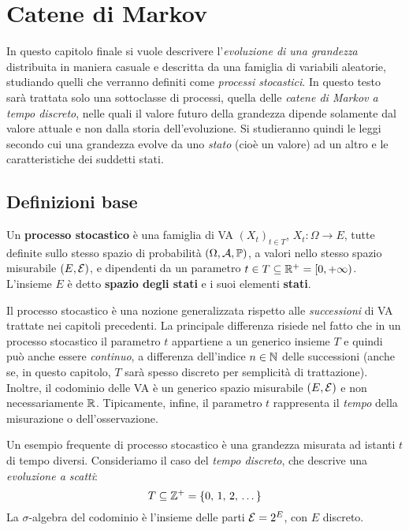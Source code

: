 \section{Catene di Markov}
In questo capitolo finale si vuole descrivere l'\emph{evoluzione di una grandezza} distribuita in maniera casuale e descritta da una famiglia di variabili aleatorie,
studiando quelli che verranno definiti come \emph{processi stocastici}.
In questo testo sarà trattata solo una sottoclasse di processi,
quella delle \emph{catene di Markov a tempo discreto}, nelle quali il valore futuro della grandezza dipende solamente dal valore attuale e non dalla storia dell'evoluzione.
Si studieranno quindi le leggi secondo cui una grandezza evolve da uno \textit{stato} (cioè un valore) ad un altro e le caratteristiche dei suddetti stati.

\subsection{Definizioni base}

\begin{defn}\label{proc-stoc}
	Un \textbf{processo stocastico} è una famiglia di VA $(X_t)_{t \in T}$, $X_t: \Omega \to E$,
	tutte definite sullo stesso spazio di probabilità $(\Omega, \mathcal A, \mathbb P)$, a valori nello stesso spazio misurabile $(E,\mathcal E)$,
	e dipendenti da un parametro $t \in T \subseteq \mathbb R^+ = [0,+\infty)$. \\
	L'insieme $E$ è detto \textbf{spazio degli stati} e i suoi elementi \textbf{stati}.

\end{defn}
Il processo stocastico è una nozione generalizzata rispetto alle \textit{successioni} di VA trattate nei capitoli precedenti.
La principale differenza risiede nel fatto che in un processo stocastico il parametro $t$ appartiene a un generico insieme $T$ e quindi può anche essere \emph{continuo}, a differenza dell'indice $n \in \mathbb N$ delle successioni (anche se, in questo capitolo, $T$ sarà spesso discreto per semplicità di trattazione).
Inoltre, il codominio delle VA è un generico spazio misurabile $(E,\mathcal E)$ e non necessariamente $\mathbb R$.
Tipicamente, infine, il parametro $t$ rappresenta il \textit{tempo} della misurazione o dell'osservazione.

\begin{ese}
	Un esempio frequente di processo stocastico è una grandezza misurata ad istanti $t$ di tempo diversi.
	Consideriamo il caso del \emph{tempo discreto}, che descrive una \emph{evoluzione a scatti}:
	$$T \subseteq \mathbb Z^+ = \{0,\, 1,\, 2,\, \dots\}$$
	La $\sigma$-algebra del codominio è l'insieme delle parti $\mathcal E = 2^E$, con $E$ discreto.
\end{ese}

